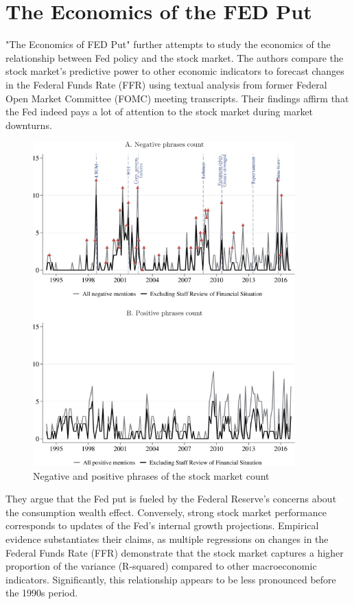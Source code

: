 \pagebreak

\section{The Economics of the FED Put}
"The Economics of FED Put" further attempts to study the economics of the relationship between Fed policy and the stock market. The authors compare the stock market's predictive power to other economic indicators to forecast changes in the Federal Funds Rate (FFR) using textual analysis from former Federal Open Market Committee (FOMC) meeting transcripts. Their findings affirm that the Fed indeed pays a lot of attention to the stock market during market downturns.

\begin{figure}[h]
    \centering
    \includegraphics[width=0.9\textwidth]{figures/cies21/Figure5}
    \caption{Negative and positive phrases of the stock market count \parencite{cieslak_economics_2021}}
\end{figure}

They argue that the Fed put is fueled by the Federal Reserve's concerns about the consumption wealth effect. Conversely, strong stock market performance corresponds to updates of the Fed’s internal growth projections. Empirical evidence substantiates their claims, as multiple regressions on changes in the Federal Funds Rate (FFR) demonstrate that the stock market captures a higher proportion of the variance (R-squared) compared to other macroeconomic indicators. Significantly, this relationship appears to be less pronounced before the 1990s period.  \parencite{cieslak_economics_2021}

